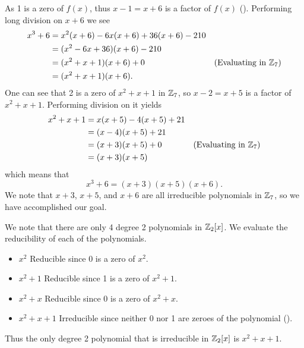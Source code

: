 \begin{questions}
\begin{partquestions}{\roman*}
        \item As 1 is a zero of $f(x)$, thus $x-1 = x+6$ is a factor of $f(x)$ (). Performing long division on $x+6$ we see
        \begin{align*}
            x^3 + 6 &= x^2(x+6) - 6x(x+6) + 36(x+6) - 210\\
            &= (x^2-6x+36)(x+6) - 210\\
            &= (x^2+x+1)(x+6) + 0 & (\text{Evaluating in }\mathbb{Z}_7)\\
            &= (x^2+x+1)(x+6).
        \end{align*}
        One can see that 2 is a zero of $x^2 + x + 1$ in $\mathbb{Z}_7$, so $x - 2 = x+5$ is a factor of $x^2 + x + 1$. Performing division on it yields
        \begin{align*}
            x^2 + x + 1 &= x(x+5) - 4(x+5) + 21\\
            &= (x-4)(x+5) + 21\\
            &= (x+3)(x+5) + 0 & (\text{Evaluating in }\mathbb{Z}_7)\\
            &= (x+3)(x+5)
        \end{align*}
        which means that
        \[
            x^3 + 6 = (x+3)(x+5)(x+6).
        \]
        We note that $x+3$, $x+5$, and $x+6$ are all irreducible polynomials in $\mathbb{Z}_7$, so we have accomplished our goal.
    \end{partquestions}

    \item \begin{partquestions}{\alph*}
        \item We note that there are only 4 degree 2 polynomials in $\mathbb{Z}_2[x]$. We evaluate the reducibility of each of the polynomials.
        \begin{itemize}
            \item $\boxed{x^2}$ Reducible since 0 is a zero of $x^2$.
            \item $\boxed{x^2 + 1}$ Reducible since 1 is a zero of $x^2 + 1$.
            \item $\boxed{x^2+x}$ Reducible since 0 is a zero of $x^2 + x$.
            \item $\boxed{x^2+x+1}$ Irreducible since neither 0 nor 1 are zeroes of the polynomial ().
        \end{itemize}
        Thus the only degree 2 polynomial that is irreducible in $\mathbb{Z}_2[x]$ is $x^2+x+1$.


\end{partquestions}
\end{questions}
